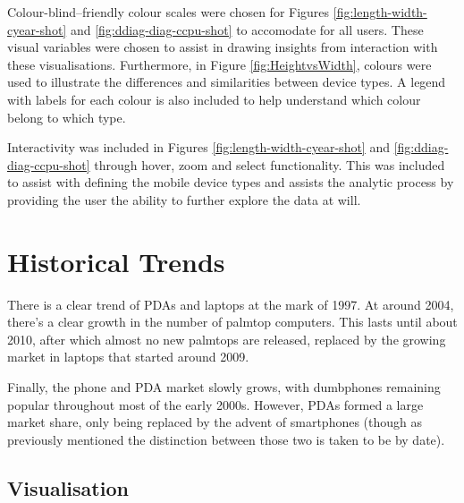 \documentclass[conference]{IEEEtran}
\begin{document}
Colour-blind--friendly colour scales were chosen for Figures
\ref{fig:length-width-cyear-shot} and \ref{fig:ddiag-diag-ccpu-shot} to
accomodate for all users. These visual variables were chosen to assist in
drawing insights from interaction with these visualisations. Furthermore,
in Figure \ref{fig:HeightvsWidth}, colours were used to illustrate the
differences and similarities between device types. A legend with labels for
each colour is also included to help understand which colour belong to which
type.

Interactivity was included in Figures \ref{fig:length-width-cyear-shot} and
\ref{fig:ddiag-diag-ccpu-shot} through hover, zoom and select
functionality. This was included to assist with defining the mobile device
types and assists the analytic process by providing the user the ability to
further explore the data at will.

\section{Historical Trends}

There is a clear trend of PDAs and laptops at the mark of 1997. At around 2004, there's a clear growth in the number of palmtop computers. This lasts until about 2010, after which almost no new palmtops are released, replaced by the growing market in laptops that started around 2009.

Finally, the phone and PDA market slowly grows, with dumbphones remaining popular throughout most of the early 2000s. However, PDAs formed a large market share, only being replaced by the advent of smartphones (though as previously mentioned the distinction between those two is taken to be by date).

\subsection{Visualisation}
\end{document}
